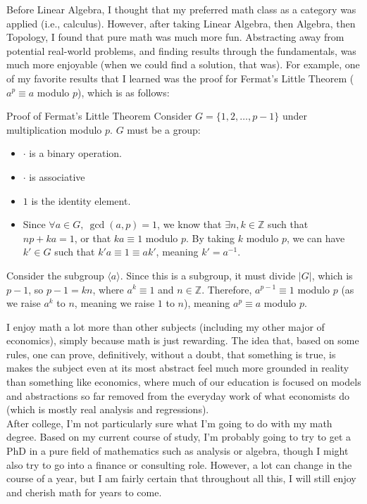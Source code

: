 \documentclass[10pt]{extarticle}
\newcommand{\Z}{\mathbb{Z}}
\begin{document}
  Before Linear Algebra, I thought that my preferred math class as a category was applied (i.e., calculus). However, after taking Linear Algebra, then Algebra, then Topology, I found that pure math was much more fun. Abstracting away from potential real-world problems, and finding results through the fundamentals, was much more enjoyable (when we could find a solution, that was). For example, one of my favorite results that I learned was the proof for Fermat's Little Theorem ($a^{p} \equiv a $ modulo $p$), which is as follows:
  \begin{problem}{Proof of Fermat's Little Theorem}
    Consider $G = \{1,2,\dots,p-1\}$ under multiplication modulo $p$. $G$ must be a group:
    \begin{itemize}
      \item $\cdot$ is a binary operation.
      \item $\cdot$ is associative
      \item $1$ is the identity element.
      \item Since $\forall a\in G,~\gcd(a,p) = 1$, we know that $\exists n,k\in \Z$ such that $np + ka = 1$, or that $ka \equiv 1$ modulo $p$. By taking $k$ modulo $p$, we can have $k'\in G$ such that $k'a \equiv 1 \equiv ak'$, meaning $k' = a^{-1}$.
    \end{itemize}
    Consider the subgroup $\langle a \rangle$. Since this is a subgroup, it must divide $|G|$, which is $p-1$, so $p-1 = kn$, where $a^k \equiv 1$ and $n\in\Z$. Therefore, $a^{p-1} \equiv 1$ modulo  $p$ (as we raise $a^k$ to $n$, meaning we raise $1$ to $n$), meaning $a^p \equiv a$ modulo $p$.
  \end{problem}
  I enjoy math a lot more than other subjects (including my other major of economics), simply because math is just rewarding. The idea that, based on some rules, one can prove, definitively, without a doubt, that something is true, is makes the subject even at its most abstract feel much more grounded in reality than something like economics, where much of our education is focused on models and abstractions so far removed from the everyday work of what economists do (which is mostly real analysis and regressions).\\

  After college, I'm not particularly sure what I'm going to do with my math degree. Based on my current course of study, I'm probably going to try to get a PhD in a pure field of mathematics such as analysis or algebra, though I might also try to go into a finance or consulting role. However, a lot can change in the course of a year, but I am fairly certain that throughout all this, I will still enjoy and cherish math for years to come.
\end{document}
